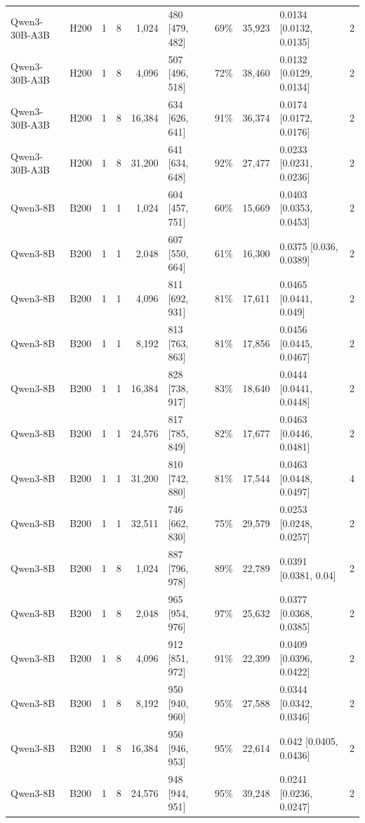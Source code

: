 \begin{landscape}
\begin{longtable}{llrrrlrrlr}
Qwen3-30B-A3B & H200 & 1 & 8 & 1,024 & 480 {[}479, 482{]} & 69\% & 35,923 & 0.0134 {[}0.0132, 0.0135{]} & 2 \\
Qwen3-30B-A3B & H200 & 1 & 8 & 4,096 & 507 {[}496, 518{]} & 72\% & 38,460 & 0.0132 {[}0.0129, 0.0134{]} & 2 \\
Qwen3-30B-A3B & H200 & 1 & 8 & 16,384 & 634 {[}626, 641{]} & 91\% & 36,374 & 0.0174 {[}0.0172, 0.0176{]} & 2 \\
Qwen3-30B-A3B & H200 & 1 & 8 & 31,200 & 641 {[}634, 648{]} & 92\% & 27,477 & 0.0233 {[}0.0231, 0.0236{]} & 2 \\
Qwen3-8B & B200 & 1 & 1 & 1,024 & 604 {[}457, 751{]} & 60\% & 15,669 & 0.0403 {[}0.0353, 0.0453{]} & 2 \\
Qwen3-8B & B200 & 1 & 1 & 2,048 & 607 {[}550, 664{]} & 61\% & 16,300 & 0.0375 {[}0.036, 0.0389{]} & 2 \\
Qwen3-8B & B200 & 1 & 1 & 4,096 & 811 {[}692, 931{]} & 81\% & 17,611 & 0.0465 {[}0.0441, 0.049{]} & 2 \\
Qwen3-8B & B200 & 1 & 1 & 8,192 & 813 {[}763, 863{]} & 81\% & 17,856 & 0.0456 {[}0.0445, 0.0467{]} & 2 \\
Qwen3-8B & B200 & 1 & 1 & 16,384 & 828 {[}738, 917{]} & 83\% & 18,640 & 0.0444 {[}0.0441, 0.0448{]} & 2 \\
Qwen3-8B & B200 & 1 & 1 & 24,576 & 817 {[}785, 849{]} & 82\% & 17,677 & 0.0463 {[}0.0446, 0.0481{]} & 2 \\
Qwen3-8B & B200 & 1 & 1 & 31,200 & 810 {[}742, 880{]} & 81\% & 17,544 & 0.0463 {[}0.0448, 0.0497{]} & 4 \\
Qwen3-8B & B200 & 1 & 1 & 32,511 & 746 {[}662, 830{]} & 75\% & 29,579 & 0.0253 {[}0.0248, 0.0257{]} & 2 \\
Qwen3-8B & B200 & 1 & 8 & 1,024 & 887 {[}796, 978{]} & 89\% & 22,789 & 0.0391 {[}0.0381, 0.04{]} & 2 \\
Qwen3-8B & B200 & 1 & 8 & 2,048 & 965 {[}954, 976{]} & 97\% & 25,632 & 0.0377 {[}0.0368, 0.0385{]} & 2 \\
Qwen3-8B & B200 & 1 & 8 & 4,096 & 912 {[}851, 972{]} & 91\% & 22,399 & 0.0409 {[}0.0396, 0.0422{]} & 2 \\
Qwen3-8B & B200 & 1 & 8 & 8,192 & 950 {[}940, 960{]} & 95\% & 27,588 & 0.0344 {[}0.0342, 0.0346{]} & 2 \\
Qwen3-8B & B200 & 1 & 8 & 16,384 & 950 {[}946, 953{]} & 95\% & 22,614 & 0.042 {[}0.0405, 0.0436{]} & 2 \\
Qwen3-8B & B200 & 1 & 8 & 24,576 & 948 {[}944, 951{]} & 95\% & 39,248 & 0.0241 {[}0.0236, 0.0247{]} & 2 \\

\end{longtable}
\end{landscape}
